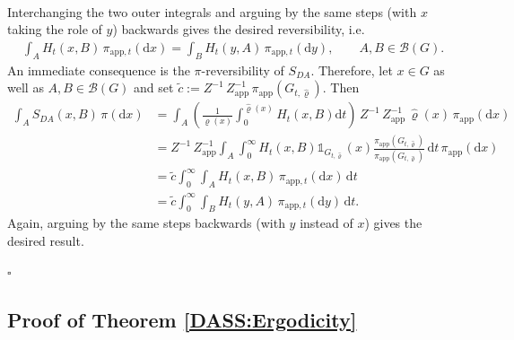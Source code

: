 \documentclass[sn-mathphys-num]{sn-jnl}%
\theoremstyle{thmstyleone}%
\theoremstyle{thmstyletwo}%
\theoremstyle{thmstylethree}%
\begin{document}
\begin{appendices}
\begin{align*}
\end{align*}
Interchanging the two outer integrals and arguing by the same steps (with $x$ taking the role of $y$) backwards gives the desired reversibility, i.e. 
 \begin{align*}
        \int_{A} H_t(x,B)  \, \pi_{\text{app},t}(\mathrm{d}x)=\int_{B} H_t(y,A)  \, \pi_{\text{app},t}(\mathrm{d}y), \qquad A,B\in\mathcal{B}(G).
    \end{align*}
An immediate consequence is the $\pi$-reversibility of $S_{DA}$. Therefore, let $x\in G$ as well as $A,B\in\mathcal{B}(G)$ and set $\tilde{c}:=Z^{-1} \, Z^{-1}_{\text{app}} \, \pi_{\text{app}}(G_{t,\widehat{\varrho}})$. Then       
 \begin{align*}
        \int_{A} S_{DA}(x,B) \, \pi(\mathrm{d}x)&= \int_{A} \left(\frac{1}{\widehat{\varrho}(x)} \int_{0}^{\widehat{\varrho}(x)} H_t(x,B) \mathrm{d}t \right) \, Z^{-1} \, Z^{-1}_{\text{app}} \, \widehat{\varrho}(x) \, \pi_{\text{app}}(\mathrm{d}x) \\ 
        &=Z^{-1} \, Z^{-1}_{\text{app}}\int_{A} \int_0^\infty H_t(x,B) \mathbb{1}_{G_{t,\widehat{\varrho}}}(x) \frac{\pi_{\text{app}}(G_{t,\widehat{\varrho}})}{\pi_{\text{app}}(G_{t,\widehat{\varrho}})} \, \mathrm{d}t \, \pi_{\text{app}}(\mathrm{d}x) \\
        &= \tilde{c} \int_0^\infty \int_{A} H_t(x,B) \, \pi_{\text{app},t}(\mathrm{d}x) \, \mathrm{d}t \\
        &= \tilde{c} \int_0^\infty \int_{B} H_t(y,A) \, \pi_{\text{app},t}(\mathrm{d}y) \, \mathrm{d}t.
 \end{align*}
 Again, arguing by the same steps backwards (with $y$ instead of $x$) gives the desired result.  
\begin{flushright}    
$\square$
\end{flushright}

\subsection{Proof of Theorem \ref{DASS:Ergodicity}}\label{app:DASS_convergence}




\end{appendices}
\end{document}
